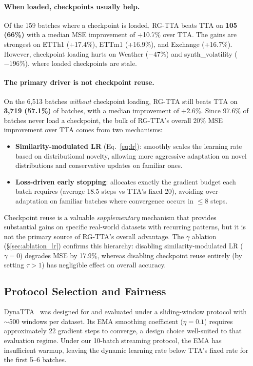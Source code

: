 \documentclass[journal]{IEEEtran}
\begin{document}
\paragraph{When loaded, checkpoints usually help.} Of the 159 batches where a checkpoint is loaded, RG-TTA beats TTA on \textbf{105 (66\%)} with a median MSE improvement of +10.7\% over TTA. The gains are strongest on ETTh1 (+17.4\%), ETTm1 (+16.9\%), and Exchange (+16.7\%). However, checkpoint loading hurts on Weather ($-47\%$) and synth\_volatility ($-196\%$), where loaded checkpoints are stale.

\paragraph{The primary driver is not checkpoint reuse.} On the 6{,}513 batches \emph{without} checkpoint loading, RG-TTA still beats TTA on \textbf{3{,}719 (57.1\%)} of batches, with a median improvement of +2.6\%. Since 97.6\% of batches never load a checkpoint, the bulk of RG-TTA's overall 20\% MSE improvement over TTA comes from two mechanisms:
\begin{itemize}[nosep]
  \item \textbf{Similarity-modulated LR} (Eq.~\ref{eq:lr}): smoothly scales the learning rate based on distributional novelty, allowing more aggressive adaptation on novel distributions and conservative updates on familiar ones.
  \item \textbf{Loss-driven early stopping}: allocates exactly the gradient budget each batch requires (average 18.5 steps vs TTA's fixed 20), avoiding over-adaptation on familiar batches where convergence occurs in $\leq$8 steps.
\end{itemize}
Checkpoint reuse is a valuable \emph{supplementary} mechanism that provides substantial gains on specific real-world datasets with recurring patterns, but it is not the primary source of RG-TTA's overall advantage. The $\gamma$ ablation (\S\ref{sec:ablation_lr}) confirms this hierarchy: disabling similarity-modulated LR ($\gamma{=}0$) degrades MSE by 17.9\%, whereas disabling checkpoint reuse entirely (by setting $\tau > 1$) has negligible effect on overall accuracy.

\subsection{Protocol Selection and Fairness}
\label{sec:fairness}

DynaTTA~\cite{grover2025dynatta} was designed for and evaluated under a sliding-window protocol with $\sim$500 windows per dataset. Its EMA smoothing coefficient ($\eta = 0.1$) requires approximately 22 gradient steps to converge, a design choice well-suited to that evaluation regime. Under our 10-batch streaming protocol, the EMA has insufficient warmup, leaving the dynamic learning rate below TTA's fixed rate for the first 5--6 batches.
\end{document}
